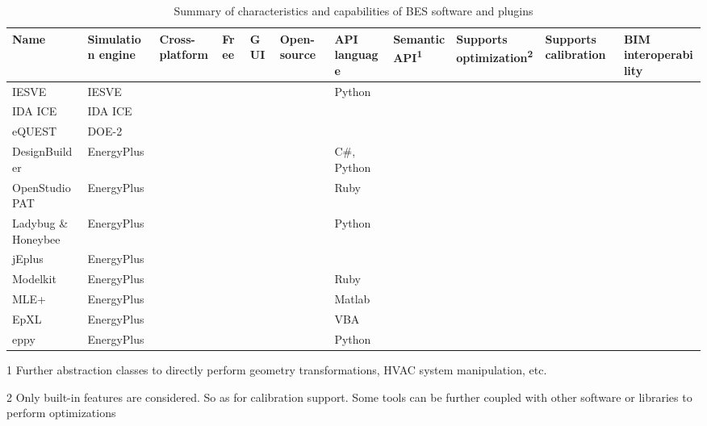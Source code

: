 \documentclass[3p, times]{elsarticle} %
\newcommand{\cmark}{\ding{51}}
\begin{document}
\setlength{\tabcolsep}{0.1pt}
\renewcommand{\arraystretch}{1.3}
\begin{table}[!h]

\begin{threeparttable}
\caption{\label{tab:pat-sum}Summary of characteristics and capabilities of BES software and plugins}
\centering
\fontsize{7}{9}\selectfont
\begin{tabular}[t]{>{\raggedright\arraybackslash}p{3.2cm}>{\centering\arraybackslash}p{1.6cm}>{\centering\arraybackslash}p{1.2cm}>{\centering\arraybackslash}p{0.65cm}>{\centering\arraybackslash}p{0.65cm}>{\centering\arraybackslash}p{1.0cm}>{\centering\arraybackslash}p{1.5cm}>{\centering\arraybackslash}p{1.3cm}>{\centering\arraybackslash}p{1.6cm}>{\centering\arraybackslash}p{1.6cm}>{\centering\arraybackslash}p{1.9cm}}
\toprule
Name & Simulation engine & Cross-platform & Free & GUI & Open-source & API language & Semantic API\textsuperscript{1} & Supports optimization\textsuperscript{2} & Supports calibration & BIM interoperability\\
\midrule
IESVE \citep{IntegratedEnvironmentalSolutionsLimited2020} & IESVE &  &  & \cmark &  & Python & \cmark & \cmark & \cmark & \cmark\\
IDA ICE \citep{Kalamees2004} & IDA ICE &  &  & \cmark &  &  &  & \cmark &  & \cmark\\
eQUEST \citep{Hirsch2020} & DOE-2 &  & \cmark & \cmark &  &  &  &  &  & \\
DesignBuilder \citep{DesignBuilderSoftwareLtd2020a} & EnergyPlus &  &  & \cmark &  & C\#, Python &  & \cmark &  & \cmark\\
OpenStudio PAT \citep{Guglielmetti2011} & EnergyPlus & \cmark & \cmark & \cmark & \cmark & Ruby & \cmark & \cmark & \cmark & \cmark\\
Ladybug \& Honeybee \citep{Roudsari2013} & EnergyPlus &  & \cmark & \cmark & \cmark & Python & \cmark &  &  & \cmark\\
jEplus \citep{Yi2020} & EnergyPlus & \cmark & \cmark & \cmark & \cmark &  &  & \cmark &  & \\
Modelkit \citep{BigLadderSoftware2020} & EnergyPlus &  & \cmark &  &  & Ruby &  &  &  & \\
MLE+ \citep{Bernal2012} & EnergyPlus &  & \cmark & \cmark & \cmark & Matlab &  & \cmark &  & \\
EpXL \citep{Schild2020} & EnergyPlus &  & \cmark & \cmark & \cmark & VBA &  & \cmark &  & \\
eppy \citep{Philip2020} & EnergyPlus & \cmark & \cmark &  & \cmark & Python &  &  &  & \\
\bottomrule
\end{tabular}
\begin{tablenotes}
\scriptsize
\item [1] Further abstraction classes to directly perform geometry transformations, HVAC system manipulation, etc.
\item [2] Only built-in features are considered. So as for calibration support. Some tools can be further coupled with other software or libraries to perform optimizations
\end{tablenotes}
\end{threeparttable}
\end{table}
\end{document}
